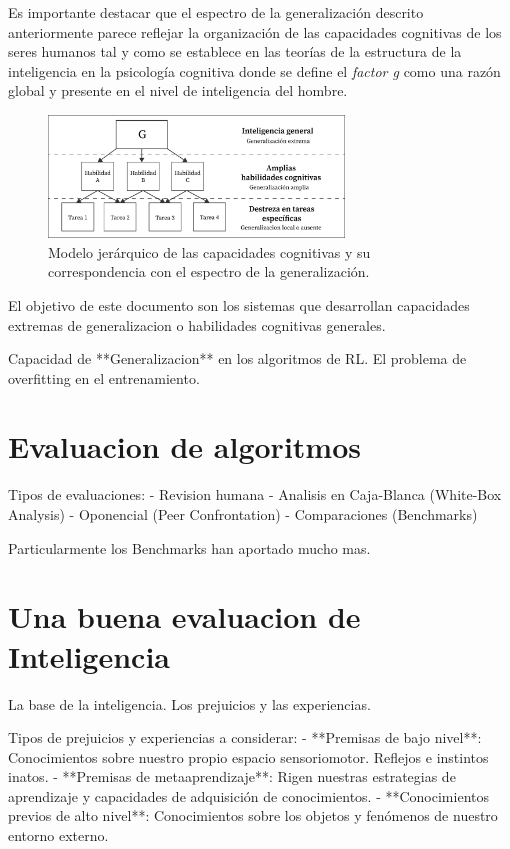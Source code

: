 Es importante destacar que el espectro de la generalización descrito anteriormente parece reflejar la organización de las capacidades cognitivas de los seres humanos tal y como se establece en las teorías de la estructura de la inteligencia en la psicología cognitiva donde se define el \textit{factor g} como una razón global y presente en el nivel de inteligencia del hombre. 

\begin{figure}[ht!]
    \centering
    \includegraphics[width=0.7\textwidth]{Graphics/g-factor.png}
    \caption{Modelo jerárquico de las capacidades cognitivas y su correspondencia con el espectro de la generalización.}
    \label{fig:g-factor}
\end{figure}

El objetivo de este documento son los sistemas que desarrollan capacidades extremas de generalizacion o habilidades cognitivas generales.

Capacidad de **Generalizacion** en los algoritmos de RL. El problema de overfitting en el entrenamiento.

\section{Evaluacion de algoritmos}\label{section:state-of-the-art:evaluating-algoritms}

Tipos de evaluaciones: 
- Revision humana
- Analisis en Caja-Blanca (White-Box Analysis)
- Oponencial (Peer Confrontation)
- Comparaciones (Benchmarks)

Particularmente los Benchmarks han aportado mucho mas. 

\section{Una buena evaluacion de Inteligencia}\label{section:state-of-the-art:a-good-measure-of-inteligence}

La base de la inteligencia. Los prejuicios y las experiencias.

Tipos de prejuicios y experiencias a considerar:
- **Premisas de bajo nivel**: Conocimientos sobre nuestro propio espacio sensoriomotor. Reflejos e instintos inatos.
- **Premisas de metaaprendizaje**: Rigen nuestras estrategias de aprendizaje y capacidades de adquisición de conocimientos.
- **Conocimientos previos de alto nivel**: Conocimientos sobre los objetos y fenómenos de nuestro entorno externo.

